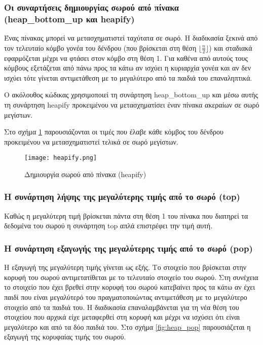 

\subsubsection*{Οι συναρτήσεις δημιουργίας σωρού από πίνακα (heap\_bottom\_up και heapify)}
Ένας πίνακας μπορεί να μετασχηματιστεί ταχύτατα σε σωρό. Η διαδικασία ξεκινά από τον τελευταίο κόμβο γονέα του δένδρου (που βρίσκεται στη θέση $\lfloor{\frac{n}{2}}\rfloor$) και σταδιακά εφαρμόζεται μέχρι να φτάσει στον κόμβο στη θέση 1. Για καθένα από αυτούς τους κόμβους εξετάζεται από πάνω προς τα κάτω αν ισχύει η κυριαρχία γονέα και αν δεν ισχύει τότε γίνεται αντιμετάθεση με το μεγαλύτερο από τα παιδιά του επαναληπτικά. 

Ο ακόλουθος κώδικας χρησιμοποιεί τη συνάρτηση heap\_bottom\_up και μέσω αυτής τη συνάρτηση heapify προκειμένου να μετασχηματίσει έναν πίνακα ακεραίων σε σωρό μεγίστων. 




Στο σχήμα \ref{fig:heapify} παρουσιάζονται οι τιμές που έλαβε κάθε κόμβος του δένδρου προκειμένου να μετασχηματιστεί τελικά σε σωρό μεγίστων.

\begin{figure}[ht]
\centering
\texttt{[image: heapify.png]}
\caption{Δημιουργία σωρού από πίνακα (heapify)}
\label{fig:heapify}
\end{figure}

\subsubsection*{Η συνάρτηση λήψης της μεγαλύτερης τιμής από το σωρό (top)}
Καθώς η μεγαλύτερη τιμή βρίσκεται πάντα στη θέση 1 του πίνακα που διατηρεί τα δεδομένα του σωρού η συνάρτηση top απλά επιστρέφει την τιμή αυτή.

\subsubsection*{Η συνάρτηση εξαγωγής της μεγαλύτερης τιμής από το σωρό (pop)}
Η εξαγωγή της μεγαλύτερη τιμής γίνεται ως εξής. Το στοιχείο που βρίσκεται στην κορυφή του σωρού αντιμετατίθεται με το τελευταίο στοιχείο του σωρού. Στη συνέχεια το στοιχείο που έχει βρεθεί στην κορυφή του σωρού κατεβαίνει προς τα κάτω αν έχει παιδί που είναι μεγαλύτερό του πραγματοποιώντας αντιμετάθεση με το μεγαλύτερο στοιχείο από τα παιδιά του. Η διαδικασία επαναλαμβάνεται για τη νέα θέση του στοιχείου που αρχικά είχε μεταφερθεί στη κορυφή και μέχρι να ισχύσει ότι είναι μεγαλύτερο και από τα δύο παιδιά του. Στο σχήμα \ref{fig:heap_pop} παρουσιάζεται η εξαγωγή της κορυφαίας τιμής του σωρού.

